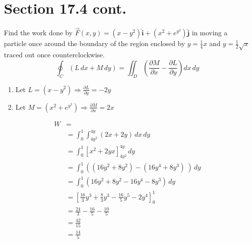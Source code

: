 \documentclass[letter,11pt]{article}
\begin{document}
\section*{Section 17.4 cont.}
Find the work done by $\vec{F}(x, y)=\left(x-y^2\right) \hat{\mathbf{i}}+\left(x^2+e^{y^2}\right) \hat{\mathbf{j}}$ in moving a particle once around the boundary of the region enclosed by $y=\frac{1}{4}x$ and $y=\frac{1}{2}\sqrt{x}$ traced out once counterclockwise.
$$\oint_C (L\, dx + M\, dy) = \iint_{D} \left(\frac{\partial M}{\partial x} - \frac{\partial L}{\partial y}\right) dx\, dy$$
    \begin{enumerate}
        \item Let $L=\left(x-y^2\right) \Longrightarrow \frac{\partial L}{\partial y} = -2y$
        \item Let $M=\left(x^2+e^{y^2}\right) \Longrightarrow \frac{\partial M}{\partial x} = 2x$
    \end{enumerate}
    \begin{align*}
    W &=\\
    &= \int_{0}^{1}\int_{4y^{2}}^{4y}\left(2x+2y\right) \, dx\, dy\\
    &= \int_{0}^{1}\left[x^2+2yx\right]_{4y^{2}}^{4y}\, dy\\
    &= \int_{0}^{1}\left(\left(16y^{2}+8y^{2}\right)-\left(16y^{4}+8y^{3}\right)\ \right)\,dy\\
    &= \int_{0}^{1}\left(16y^{2}+8y^{2}-16y^{4}-8y^{3}\right)\,dy\\
    &= \left[\frac{16}{3}y^{3}+\frac{8}{3}y^{3}-\frac{16}{5}y^{5}-2y^{4}\right]_{0}^{1}\\
    &= \frac{24}{3}-\frac{16}{5}-\frac{10}{5} \\
    &= \frac{42}{15}\\
    &= \boxed{\frac{14}{5}}
     \end{align*}
\end{document}
